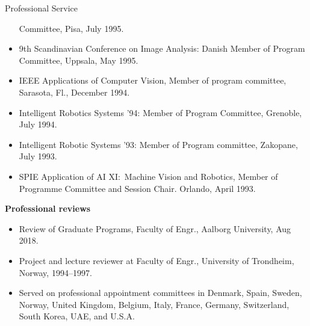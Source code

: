\documentclass{article}
\begin{document}
\begin{cv}
\begin{cvlist}{Professional Service}
\begin{itemize}
			      Committee, Pisa, July 1995.
			\item 9th Scandinavian Conference on Image Analysis: Danish Member of Program
			      Committee, Uppsala, May 1995.
			\item IEEE Applications of Computer Vision, Member of program committee,
			      Sarasota, Fl., December 1994.
			\item Intelligent Robotics Systems '94: Member of Program Committee, Grenoble,
			      July 1994.
			\item Intelligent Robotic Systems '93: Member of Program committee, Zakopane,
			      July 1993.
			\item SPIE Application of AI XI:\ Machine Vision and Robotics, Member of
			      Programme Committee and Session Chair. Orlando, April 1993.
		\end{itemize}

		\item {\bf Professional reviews}
		\begin{itemize}
			\item Review of Graduate Programs, Faculty of Engr., Aalborg University, Aug
			      2018.
			\item Project and lecture reviewer at Faculty of Engr., University of Trondheim,
			      Norway, 1994--1997.
			\item Served on professional appointment committees in Denmark, Spain, Sweden,
			      Norway, United Kingdom, Belgium, Italy, France, Germany, Switzerland,
			      South Korea, UAE, and U.S.A.
		\end{itemize}


\end{cvlist}
\end{cv}
\end{document}
